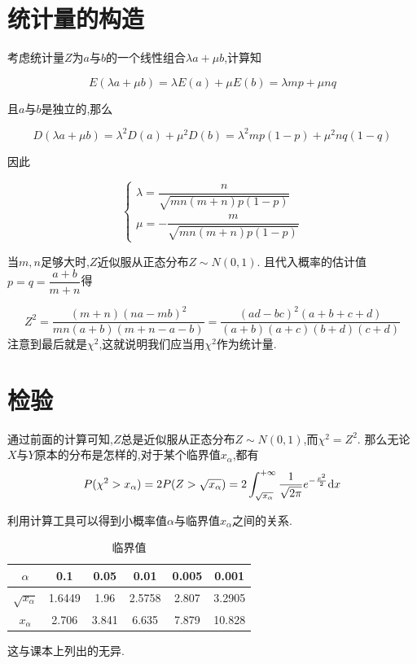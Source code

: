 \documentclass{article}
\begin{document}
\section{统计量的构造}

考虑统计量$Z$为$a$与$b$的一个线性组合$\lambda a + \mu b$,计算知

\[ E(\lambda a + \mu b) = \lambda E(a) + \mu E(b) = \lambda mp + \mu nq \]

且$a$与$b$是独立的,那么

\[ D(\lambda a + \mu b) = \lambda^2 D(a) + \mu^2 D(b) = \lambda^2 mp(1 - p) + \mu^2 nq(1 - q) \]

因此

\[ \begin{cases}
    \lambda = \dfrac{n}{\sqrt{mn(m + n)p(1 - p)}} \\ \mu = -\dfrac{m}{\sqrt{mn(m + n)p(1 - p)}}
\end{cases} \]

当$m, n$足够大时,$Z$近似服从正态分布$Z \sim N(0, 1)$.
且代入概率的估计值$p = q = \dfrac{a + b}{m + n}$得

\[ Z^2 = \dfrac{(m + n)(na - mb)^2}{mn(a + b)(m + n - a - b)} = \dfrac{(ad - bc)^2(a + b + c + d)}{(a + b)(a + c)(b + d)(c + d)} \]
注意到最后就是$\chi^2$,这就说明我们应当用$\chi^2$作为统计量.

\section{检验}

通过前面的计算可知,$Z$总是近似服从正态分布$Z \sim N(0, 1)$,而$\chi^2 = Z^2$.
那么无论$X$与$Y$原本的分布是怎样的,对于某个临界值$x_\alpha$,都有
\[ P(\chi^2 > x_\alpha) = 2P(Z > \sqrt{x_\alpha}) = 2\int_{\sqrt{x_\alpha}}^{+\infty} \dfrac{1}{\sqrt{2\pi}} e^{-\frac{x^2}{2}} \mathrm{d} x \]

利用计算工具可以得到小概率值$\alpha$与临界值$x_{\alpha}$之间的关系.

\begin{table}[ht]
    \centering
    \caption{临界值}
    \begin{tabular}{|c|c|c|c|c|c|}
        \hline
        $\alpha$ & 0.1 & 0.05 & 0.01 & 0.005 & 0.001 \\
        \hline
        $\sqrt{x_\alpha}$ & 1.6449 & 1.96 & 2.5758 & 2.807 & 3.2905 \\
        \hline
        $x_\alpha$ & 2.706 & 3.841 & 6.635 & 7.879 & 10.828 \\
        \hline
    \end{tabular}
\end{table}

这与课本上列出的无异.
\end{document}
